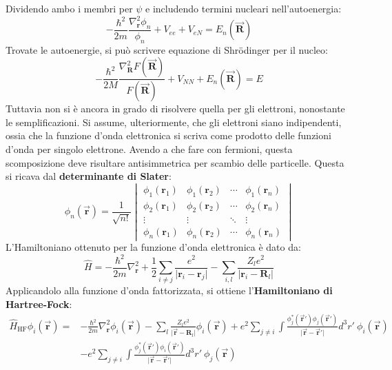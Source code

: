 \documentclass[10pt, a4paper]{scrartcl}
\numberwithin{equation}{subsection}
\theoremstyle{style1}
\theoremstyle{style2}
\begin{document}
Dividendo ambo i membri per $\psi $ e includendo termini nucleari nell'autoenergia:
\begin{equation}
-\frac{\hbar ^2}{2m}\frac{\nabla ^2 _\mathbf{r} \phi _n}{\phi _n} + V_{ee}  + V_{eN} = E_n(\vec{\mathbf{R} })
\end{equation}
Trovate le autoenergie, si pu\`o scrivere equazione di Shr\"odinger per il nucleo:
\begin{equation}
	-\frac{\hbar ^2}{2M} \frac{\nabla ^2 _\mathbf{R} F(\vec{\mathbf{R} })}{F(\vec{\mathbf{R} })} + V_{N N } + E_n(\vec{\mathbf{R} }) = E
\end{equation}
Tuttavia non si è ancora in grado di risolvere quella per gli elettroni, nonostante le semplificazioni.
Si assume, ulteriormente, che gli elettroni siano indipendenti, ossia che la funzione d'onda elettronica si scriva come prodotto delle funzioni d'onda per singolo elettrone.
Avendo a che fare con fermioni, questa scomposizione deve risultare antisimmetrica per scambio delle particelle. 
Questa si ricava dal \textbf{determinante di Slater}:
\begin{equation}
	\phi _n (\vec{\mathbf{r} }) = \frac{1}{\sqrt{n!} } \begin{vmatrix} \phi _1(\mathbf{r} _1) & \phi _1(\mathbf{r} _2) & \cdots & \phi _1 (\mathbf{r} _n) \\ 
	\phi_2 (\mathbf{r}_1 )& \phi _2 ( \mathbf{r} _2) & \cdots & \phi _2 (\mathbf{r} _n)\\
	\vdots & \vdots& \ddots & \vdots\\
\phi _n (\mathbf{r} _1) & \phi _n (\mathbf{r} _2) & \cdots &\phi _n(\mathbf{r} _n)\end{vmatrix} 
\end{equation}
L'Hamiltoniano ottenuto per la funzione d'onda elettronica \`e dato da:
\begin{equation}
	\hat{H} = -\frac{\hbar^2}{2m} \nabla ^2_\mathbf{r}  + \frac{1}{2}\sum_{i\neq j}^{} \frac{e^2}{\lvert \mathbf{r} _i - \mathbf{r} _j \rvert } - \sum_{i,l}^{} \frac{Z_l e^2}{\lvert \mathbf{r} _i - \mathbf{R} _l \rvert }
\end{equation}
Applicandolo alla funzione d'onda fattorizzata, si ottiene l'\textbf{Hamiltoniano di Hartree-Fock}:
\begin{equation}
	\begin{split}
		\hat{H}_\text{HF} \phi _i (\vec{\mathbf{r} } ) = &- \frac{\hbar ^2}{2m} \nabla _\mathbf{r} ^2 \phi _i(\vec{\mathbf{r} })-\sum_{l}^{} \frac{Z_l e^2}{\lvert \vec{\mathbf{r} } - \mathbf{R} _l \rvert } \phi _i (\vec{\mathbf{r} }) + e^2 \sum_{j\neq i }^{} \int \frac{\phi _j^*(\vec{\mathbf{r} }') \phi _j(\vec{\mathbf{r} }')}{\lvert \vec{\mathbf{r} }-\vec{\mathbf{r} }' \rvert } d^3 r' \ \phi _i (\vec{\mathbf{r} })\\
							   &-e^2 \sum_{j\neq i}^{} \int \frac{\phi _j^*(\vec{\mathbf{r} }') \phi _i (\vec{\mathbf{r} }')}{\lvert \vec{\mathbf{r} }- \vec{\mathbf{r} }' \rvert } d^3 r' \ \phi _j (\vec{\mathbf{r} })
	\end{split}
\end{equation}
\end{document}

